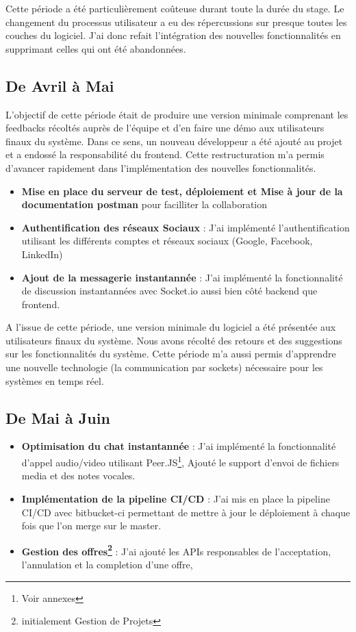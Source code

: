 {\vspace{1cm}
Cette période a été particulièrement coûteuse durant toute la durée du stage. Le changement du processus utilisateur a eu des répercussions sur presque toutes les couches du logiciel. J'ai donc refait l'intégration des nouvelles fonctionnalités en supprimant celles qui ont été abandonnées.

\subsection*{De Avril à Mai}

L'objectif de cette période était de produire une version minimale comprenant les feedbacks récoltés auprès de l'équipe et d'en faire une démo aux utilisateurs finaux du système. Dans ce sens, un nouveau développeur a été ajouté au projet et a endossé la responsabilité du frontend. Cette restructuration m'a permis d'avancer rapidement dans l'implémentation des nouvelles fonctionnalités.\\

\begin{itemize}
    \item \textbf{Mise en place du serveur de test, déploiement et Mise à jour de la documentation postman}  pour facilliter la collaboration
    \item \textbf{Authentification des réseaux Sociaux} : J'ai implémenté l'authentification utilisant les différents comptes et réseaux sociaux (Google, Facebook, LinkedIn)
    \item \textbf{Ajout de la messagerie instantannée} : J'ai implémenté la fonctionnalité de discussion instantannées avec Socket.io aussi bien côté backend que frontend.
\end{itemize}
\vspace{1cm}

A l'issue de cette période, une version minimale du logiciel a été présentée aux utilisateurs finaux du système. Nous avons récolté des retours et des suggestions sur les fonctionnalités du système. 
Cette période m'a aussi permis d'apprendre une nouvelle technologie (la communication par sockets) nécessaire pour les systèmes en temps réel. 

\subsection*{De Mai à Juin}

\begin{itemize}
    \item \textbf{Optimisation du chat instantannée} : J'ai implémenté la fonctionnalité d'appel audio/video utilisant Peer.JS\footnote{Voir annexes}, Ajouté le support d'envoi de fichiers media et des notes vocales. 
    \item \textbf{Implémentation de la pipeline CI/CD} : J'ai mis en place la pipeline CI/CD avec bitbucket-ci permettant de mettre à jour le déploiement à chaque fois que l'on merge sur le master.
    \item \textbf{Gestion des offres\footnote{initialement Gestion de Projets}} : J'ai ajouté les APIs responsables de l'acceptation, l'annulation et la completion d'une offre, 
\end{itemize}

}
